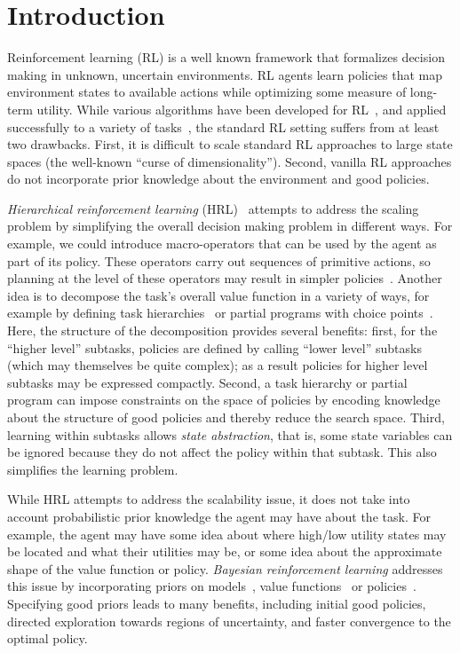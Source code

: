 \section{Introduction}
\label{sec:intro}

Reinforcement learning (RL) is a well known framework that formalizes
decision making in unknown, uncertain environments. RL agents learn
policies that map environment states to available actions while
optimizing some measure of long-term utility. While various algorithms
have been developed for RL~\cite{suttbarto}, and applied successfully
to a variety of tasks~\cite{kaelbling.jair96}, the standard RL setting
suffers from at least two drawbacks. First, it is difficult to scale
standard RL approaches to large state spaces (the well-known ``curse
of dimensionality''). Second, vanilla RL approaches do not incorporate
prior knowledge about the environment and good policies.

{\em Hierarchical reinforcement learning} (HRL)~\cite{barto.deds03}
attempts to address the scaling problem by simplifying the overall
decision making problem in different ways. For example, we could
introduce macro-operators that can be used by the agent as part of its
policy. These operators carry out sequences of primitive actions, so
planning at the level of these operators may  result in
simpler policies~\cite{stolle.book02}. Another idea is to decompose
the task's overall value function in a variety of ways, for example by
defining task hierarchies~\cite{d-hrl-00} or partial programs with
choice points~\cite{alisp}. Here, the structure of the decomposition
provides several benefits: first, for the ``higher level'' subtasks,
policies are defined by calling ``lower level'' subtasks (which may
themselves be quite complex); as a result policies for higher level
subtasks may be expressed compactly. Second, a task hierarchy or
partial program can impose constraints on the space of policies by
encoding knowledge about the structure of good policies and thereby
reduce the search space. Third, learning within subtasks allows {\em
  state abstraction}, that is, some state variables can be ignored
because they do not affect the policy within that subtask. This also
simplifies the learning problem.

While HRL attempts to address the scalability issue, it does not take
into account probabilistic prior knowledge the agent may have about
the task. For example, the agent may have some idea about where
high/low utility states may be located and what their utilities may
be, or some idea about the approximate shape of the value function or
policy. {\em Bayesian reinforcement learning} addresses this issue by
incorporating priors on models~\cite{dearden.uai99}, value
functions~\cite{Dearden98, Engel03} or
policies~\cite{Ghavamzadeh07bayesianpolicy}.
Specifying good priors leads to many benefits, including initial good
policies, directed exploration towards regions of uncertainty, and
faster convergence to the optimal policy.

